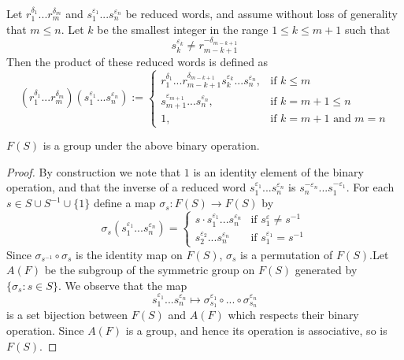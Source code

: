 \documentclass[12pt, a4paper, oneside, openright, titlepage]{book}
\begin{document}
\begin{cons}
         Let $r_1^{\delta_1}...r_m^{\delta_m}$ and $s_1^{\varepsilon_1}...s_n^{\varepsilon_n}$ be reduced words, and assume without loss of generality that $m \leq n$. Let $k$ be the smallest integer in the range $1 \leq k \leq m+1$ such that \begin{equation}
                s_k^{\varepsilon_k} \neq r_{m-k+1}^{-\delta_{m-k+1}}
        \end{equation}
        Then the product of these reduced words is defined as \begin{equation}
                (r_1^{\delta_1}...r_m^{\delta_m})(s_1^{\varepsilon_1}...s_n^{\varepsilon_n}) := \left\{\begin{array}{ll}
                        r_1^{\delta_1}...r_{m-k+1}^{\delta_{m-k+1}}s_k^{\varepsilon_k}...s_n^{\varepsilon_n}, & \text{if $k \leq m$} \\
                        s_{m+1}^{\varepsilon_{m+1}}...s_n^{\varepsilon_n}, & \text{if $k = m+1\leq n$} \\
                        1, & \text{if $k = m+1$ and $m = n$}
                \end{array}\right.
        \end{equation}
\end{cons}


\begin{thm}
        $F(S)$ is a group under the above binary operation.
\end{thm}
\begin{proof}
        By construction we note that $1$ is an identity element of the binary operation, and that the inverse of a reduced word $s_1^{\varepsilon_1}...s_n^{\varepsilon_n}$ is $s_n^{-\varepsilon_n}...s_1^{-\varepsilon_1}$. For each $s \in S\cup S^{-1} \cup\{1\}$ define a map $\sigma_s:F(S)\rightarrow F(S)$ by \begin{equation}
                \sigma_s(s_1^{\varepsilon_1}...s_n^{\varepsilon_n}) = \left\{\begin{array}{ll} 
                        s\cdot s_1^{\varepsilon_1}...s_n^{\varepsilon_n} & \text{if $s_1^{\varepsilon} \neq s^{-1}$} \\
                        s_2^{\varepsilon_2}...s_n^{\varepsilon_n} & \text{if $s_1^{\varepsilon_1} = s^{-1}$}
                \end{array}\right.
        \end{equation}
        Since $\sigma_{s^{-1}}\circ \sigma_s$ is the identity map on $F(S)$, $\sigma_s$ is a permutation of $F(S)$.Let $A(F)$ be the subgroup of the symmetric group on $F(S)$ generated by $\{\sigma_s:s\in S\}$. We observe that the map \begin{equation}
                s_1^{\varepsilon_1}...s_n^{\varepsilon_n} \mapsto \sigma_{s_1}^{\varepsilon_1}\circ ... \circ \sigma_{s_n}^{\varepsilon_n}
        \end{equation}
        is a set bijection between $F(S)$ and $A(F)$ which respects their binary operation. Since $A(F)$ is a group, and hence its operation is associative, so is $F(S)$.
\end{proof}
\end{document}

